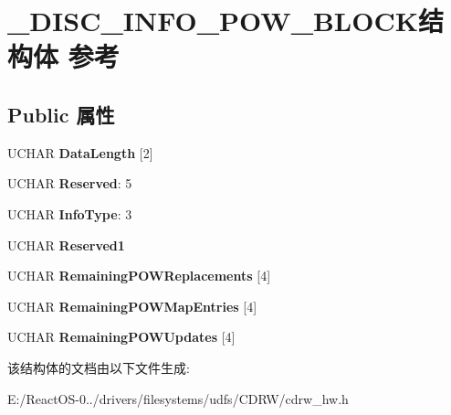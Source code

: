 \hypertarget{struct___d_i_s_c___i_n_f_o___p_o_w___b_l_o_c_k}{}\section{\+\_\+\+D\+I\+S\+C\+\_\+\+I\+N\+F\+O\+\_\+\+P\+O\+W\+\_\+\+B\+L\+O\+C\+K结构体 参考}
\label{struct___d_i_s_c___i_n_f_o___p_o_w___b_l_o_c_k}
\subsection*{Public 属性}
\begin{DoxyCompactItemize}
\item 
\mbox{\label{struct___d_i_s_c___i_n_f_o___p_o_w___b_l_o_c_k_af5aa179b909499dcb68ff3c2bf5354d7}} 
U\+C\+H\+AR {\bfseries Data\+Length} \mbox{[}2\mbox{]}
\item 
\mbox{\label{struct___d_i_s_c___i_n_f_o___p_o_w___b_l_o_c_k_a479190b90348abdef2e55de5f0b51649}} 
U\+C\+H\+AR {\bfseries Reserved}\+: 5
\item 
\mbox{\label{struct___d_i_s_c___i_n_f_o___p_o_w___b_l_o_c_k_a496ed6186909d6d8c9f985191e03df6d}} 
U\+C\+H\+AR {\bfseries Info\+Type}\+: 3
\item 
\mbox{\label{struct___d_i_s_c___i_n_f_o___p_o_w___b_l_o_c_k_ab4e52490cd89981c4b5f45c504cf1cbd}} 
U\+C\+H\+AR {\bfseries Reserved1}
\item 
\mbox{\label{struct___d_i_s_c___i_n_f_o___p_o_w___b_l_o_c_k_a82827146476a41a80df8428c445ffbf2}} 
U\+C\+H\+AR {\bfseries Remaining\+P\+O\+W\+Replacements} \mbox{[}4\mbox{]}
\item 
\mbox{\label{struct___d_i_s_c___i_n_f_o___p_o_w___b_l_o_c_k_a7ab6d945d61e294311ddf3e75f5993a2}} 
U\+C\+H\+AR {\bfseries Remaining\+P\+O\+W\+Map\+Entries} \mbox{[}4\mbox{]}
\item 
\mbox{\label{struct___d_i_s_c___i_n_f_o___p_o_w___b_l_o_c_k_a3dd4543dfeb580fa8f367c677184ad0c}} 
U\+C\+H\+AR {\bfseries Remaining\+P\+O\+W\+Updates} \mbox{[}4\mbox{]}
\end{DoxyCompactItemize}


该结构体的文档由以下文件生成\+:\begin{DoxyCompactItemize}
\item 
E\+:/\+React\+O\+S-\/0../drivers/filesystems/udfs/\+C\+D\+R\+W/cdrw\+\_\+hw.\+h\end{DoxyCompactItemize}
